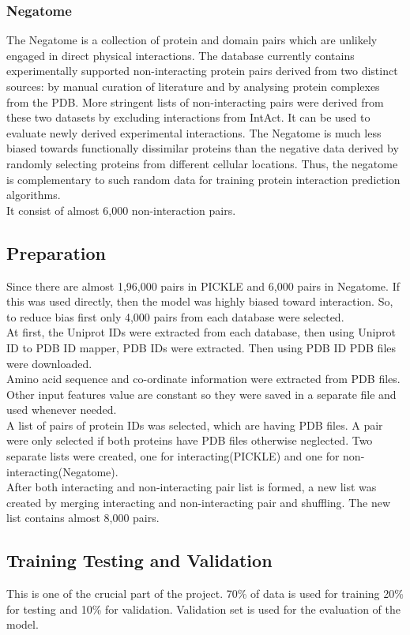\documentclass[../main.tex]{subfiles}
\begin{document}
\subsubsection{Negatome}
The Negatome is a collection of protein and domain pairs which are unlikely engaged
in direct physical interactions. The database currently contains experimentally
supported non-interacting protein pairs derived from two distinct sources: by manual
curation of literature and by analysing protein complexes from the PDB. More stringent
lists of non-interacting pairs were derived from these two datasets by excluding
interactions from IntAct. It can be used to evaluate newly derived experimental
interactions. The Negatome is much less biased towards functionally dissimilar proteins
than the negative data derived by randomly selecting proteins from different cellular
locations. Thus, the negatome is complementary to such random data for training protein
interaction prediction algorithms. \\
It consist of almost 6,000 non-interaction pairs.

\subsection{Preparation}
Since there are almost 1,96,000 pairs in PICKLE and 6,000 pairs in Negatome. If this was
used directly, then the model was highly biased toward interaction. So, to reduce
bias first only 4,000 pairs from each database were selected.\\
At first, the Uniprot IDs were extracted from each database, then using Uniprot ID to
PDB ID mapper, PDB IDs were extracted. Then using PDB ID PDB files were downloaded.\\
Amino acid sequence and co-ordinate information were extracted from PDB files. Other
input features value are constant so they were saved in a separate file and used
whenever needed.\\
A list of pairs of protein IDs was selected, which are having PDB files. A pair were only
selected if both proteins have PDB files otherwise neglected. Two separate lists
were created, one for interacting(PICKLE) and one for non-interacting(Negatome).\\
After both interacting and non-interacting pair list is formed, a new list
was created by merging interacting and non-interacting pair and shuffling. The new list
contains almost 8,000 pairs.

\subsection{Training Testing and Validation}
This is one of the crucial part of the project. 70\% of data is used for training 20\%
for testing and 10\% for validation. Validation set is used for the evaluation of
the model.
\end{document}
